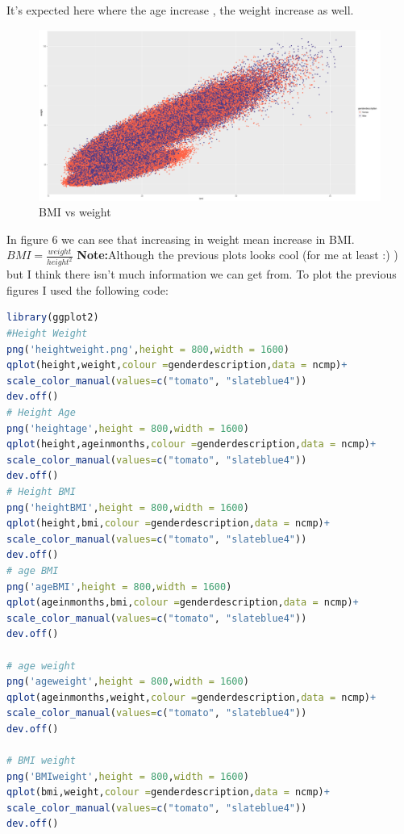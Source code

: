 \documentclass{article}
\begin{document}
It's expected here where the age increase , the weight increase as well.
\begin{figure}[H]
	\begin{center}
		\includegraphics[scale=0.3]{BMIweight.png}
	\end{center}
	\caption{BMI vs weight}
\end{figure}
In figure 6 we can see that increasing in weight mean increase in BMI.
\(BMI = \frac{weight}{height^2}\)
\textbf{Note:}Although the previous plots looks cool (for me at least :) ) but I think there isn't much information we can get from.
To plot the previous figures I used the following code:
\begin{lstlisting}[language=R]
library(ggplot2)
#Height Weight
png('heightweight.png',height = 800,width = 1600)
qplot(height,weight,colour =genderdescription,data = ncmp)+ 
scale_color_manual(values=c("tomato", "slateblue4"))
dev.off()
# Height Age
png('heightage',height = 800,width = 1600)
qplot(height,ageinmonths,colour =genderdescription,data = ncmp)+ 
scale_color_manual(values=c("tomato", "slateblue4"))
dev.off()
# Height BMI
png('heightBMI',height = 800,width = 1600)
qplot(height,bmi,colour =genderdescription,data = ncmp)+ 
scale_color_manual(values=c("tomato", "slateblue4"))
dev.off()
# age BMI
png('ageBMI',height = 800,width = 1600)
qplot(ageinmonths,bmi,colour =genderdescription,data = ncmp)+ 
scale_color_manual(values=c("tomato", "slateblue4"))
dev.off()

# age weight
png('ageweight',height = 800,width = 1600)
qplot(ageinmonths,weight,colour =genderdescription,data = ncmp)+ 
scale_color_manual(values=c("tomato", "slateblue4"))
dev.off()

# BMI weight
png('BMIweight',height = 800,width = 1600)
qplot(bmi,weight,colour =genderdescription,data = ncmp)+ 
scale_color_manual(values=c("tomato", "slateblue4"))
dev.off()

\end{lstlisting}
\end{document}

